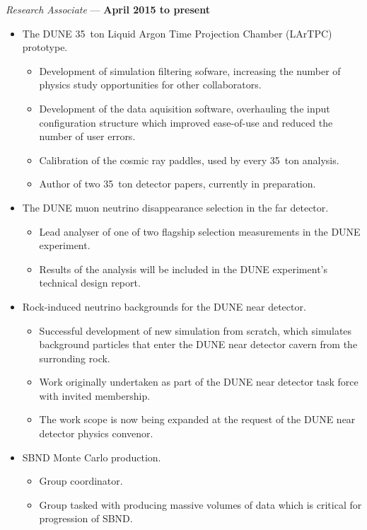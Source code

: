 \documentclass[margin,line]{res}
\begin{document}
\begin{resume}
\vspace{-.3cm}
{\em Research Associate} --- {\bf April 2015 to present}%
\begin{itemize}
\item The DUNE 35~ton Liquid Argon Time Projection Chamber (LArTPC) prototype.
\begin{itemize}
\item Development of simulation filtering sofware, increasing the number of physics study opportunities for other collaborators.
\item Development of the data aquisition software, overhauling the input configuration structure which improved ease-of-use and reduced the number of user errors.
\item Calibration of the cosmic ray paddles, used by every 35~ton analysis.
\item Author of two 35~ton detector papers, currently in preparation.
\end{itemize}
\item The DUNE muon neutrino disappearance selection in the far detector.
\begin{itemize}
\item Lead analyser of one of two flagship selection measurements in the DUNE experiment.
\item Results of the analysis will be included in the DUNE experiment's technical design report.
\end{itemize}
\item Rock-induced neutrino backgrounds for the DUNE near detector.
\begin{itemize}
\item Successful development of new simulation from scratch, which simulates background particles that enter the DUNE near detector cavern from the surronding rock.
\item Work originally undertaken as part of the DUNE near detector task force with invited membership.
\item The work scope is now being expanded at the request of the DUNE near detector physics convenor.
\end{itemize}
\item SBND Monte Carlo production.
\begin{itemize}
\item Group coordinator.
\item Group tasked with producing massive volumes of data which is critical for progression of SBND.

\end{itemize}
\end{itemize}
\end{resume}
\end{document}
